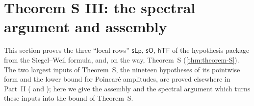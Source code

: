 \section{Theorem S III: the spectral argument and assembly}\label{sec:pf:thmS}

\providecommand{\thmSClosed}{\sfname{Closed}}
\providecommand{\thmSEv}{\sfname{Ev}}
\providecommand{\thmSdC}{d_{C}}
\providecommand{\thmSepsL}{\varepsilon_{L}}
\providecommand{\thmSId}{\mathrm{Id}}
\providecommand{\thmSDeg}{\mathrm{Deg}}
\providecommand{\thmSNG}{\mathrm{NG}}
\providecommand{\thmSGen}{\mathrm{Gen}}
\providecommand{\thmSNZ}{\mathrm{NZ}}
\providecommand{\thmSpart}{\operatorname{part}}
\providecommand{\thmSvp}{\operatorname{vp}}
\providecommand{\thmSps}{\operatorname{ps}}
\providecommand{\thmSpa}{\operatorname{pa}}
\providecommand{\thmSrow}{\operatorname{row}}
\providecommand{\thmSlev}{\operatorname{lev}}
\providecommand{\thmSjoin}{\operatorname{join}}
\providecommand{\thmSblk}{\operatorname{blk}}
\providecommand{\thmSmaj}{\operatorname{maj}}
\providecommand{\thmSSf}{\mathrm{Sf}}
\providecommand{\thmSNst}{\mathrm{N}}
\providecommand{\thmSNz}{\mathrm{N}_0}
\providecommand{\thmSNh}{\widehat{\mathrm{N}}}
\providecommand{\thmSDg}{\mathrm{Dg}}
\providecommand{\thmSgram}{\mathrm{gr}}
\providecommand{\thmStt}{\mathrm{tt}}

This section proves the three ``local rows'' $\mathsf{sLp}$, $\mathsf{sO}$, $\mathsf{hTF}$ of the hypothesis
package from the Siegel--Weil formula, and, on the way, Theorem~S (\cref{thm:theorem-S}). The two largest inputs of
Theorem~S, the nineteen hypotheses of its pointwise form and the lower bound for Poincar\'e amplitudes, are proved
elsewhere in Part~II ( and
); here we give the assembly and the spectral argument which turns these
inputs into the bound of Theorem~S.

